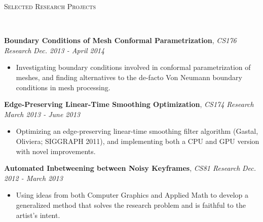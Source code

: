 \documentclass[9pt]{article}
\newenvironment{changemargin}[2]{%
  \begin{list}{}{%
    \setlength{\topsep}{0pt}%
    \setlength{\leftmargin}{#1}%
    \setlength{\rightmargin}{#2}%
    \setlength{\listparindent}{\parindent}%
    \setlength{\itemindent}{\parindent}%
    \setlength{\parsep}{\parskip}%
  }%
  \item[]}{\end{list}
}
\newcommand{\lineover}{
	\begin{changemargin}{-0.05in}{-0.05in}
		\vspace*{-8pt}
		\hrulefill \\
		\vspace*{-2pt}
	\end{changemargin}
}
\newcommand{\header}[1]{
	\begin{changemargin}{-0.5in}{-0.5in}
		\scshape{#1}\\
  	\lineover
	\end{changemargin}
}
\newenvironment{body} {
	\vspace*{-16pt}
	\begin{changemargin}{-0.25in}{-0.5in}
  }	
	{\end{changemargin}
}
\begin{document}
\header{Selected Research Projects}
\begin{body}
	\vspace{14pt}
	\textbf{Boundary Conditions of Mesh Conformal Parametrization}, \emph{CS176 Research} \hfill \emph{Dec. 2013 - April 2014} \\
		\vspace*{-3pt}
	\begin{itemize} \itemsep -0pt
	\item Investigating boundary conditions involved in conformal parametrization of meshes, and finding alternatives to the de-facto Von Neumann boundary conditions in mesh processing.
	\end{itemize}
		\vspace*{-3pt}
	\textbf{Edge-Preserving Linear-Time Smoothing Optimization}, \emph{CS174 Research} \hfill \emph{March 2013 - June 2013} \\
		\vspace*{-3pt}
	\begin{itemize} \itemsep -0pt
		\item Optimizing an edge-preserving linear-time smoothing filter algorithm (Gastal, Oliviera; SIGGRAPH 2011), and implementing both a CPU and GPU version with novel improvements.
	\end{itemize}
		\vspace*{-3pt}
	\textbf{Automated Inbetweening between Noisy Keyframes}, \emph{CS81 Research} \hfill \emph{Dec. 2012 - March 2013} \\
		\vspace*{-3pt}
	\begin{itemize} \itemsep -0pt
		\item Using ideas from both Computer Graphics and Applied Math to develop a generalized method that solves the research problem and is faithful to the artist's intent.
	\end{itemize}

\end{body}

\smallskip
\end{document}
